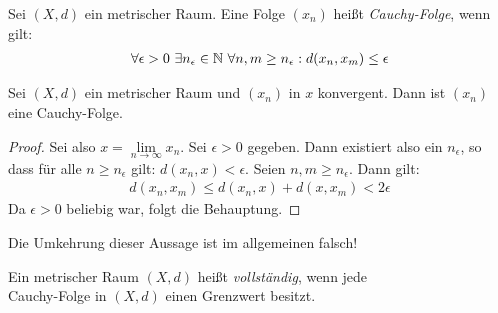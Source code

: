 \begin{Definition}{%
	Sei $(X,d)$ ein metrischer Raum. Eine Folge $(x_n)$ heißt  \emph{Cauchy-Folge}, 
	wenn gilt:
	\begin{align*}
		\forall \epsilon > 0 \text{ } \exists n_\epsilon \in \mathbb{N} \text{ }\forall n,m \geq n_\epsilon: 
		d(x_n,x_m) \leq \epsilon
	\end{align*}
}\end{Definition}

\begin{Proposition}{%
	Sei $(X,d)$ ein metrischer Raum und $(x_n)$ in $x$ konvergent. Dann ist $(x_n)$ 
	eine Cauchy-Folge.
}\end{Proposition}

\begin{proof}
	Sei also $x = \lim\limits_{n \rightarrow \infty}{x_n}$. Sei $\epsilon > 0$ 
	gegeben. Dann existiert also ein $n_\epsilon$, so dass für alle $n \geq n_\epsilon$ gilt: $d(x_n,x) < \epsilon$. Seien $n, m \geq n_\epsilon$. Dann gilt:
	\begin{align*}
		d(x_n,x_m) \leq d(x_n, x) + d(x,x_m) < 2 \epsilon
	\end{align*}
	Da $\epsilon >0$ beliebig war, folgt die Behauptung.
\end{proof}

\begin{Bemerkung}{
	Die Umkehrung dieser Aussage ist im allgemeinen falsch!
}\end{Bemerkung}

\begin{Definition}{%
	Ein metrischer Raum $(X,d)$ heißt \emph{vollständig}, wenn jede \\
	Cauchy-Folge in $(X,d)$ einen Grenzwert besitzt.
}\end{Definition}

